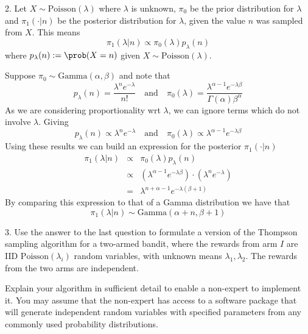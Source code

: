 \documentclass[11pt,a4paper]{article}
\begin{document}
\begin{answer}{2.}
  Let $X\sim\text{Poisson}(\lambda)$ where $\lambda$ is unknown, $\pi_0$ be the prior distribution for $\lambda$ and $\pi_1(\cdot|n)$ be the posterior distribution for $\lambda$, given the value $n$ was sampled from $X$. This means
  \[ \pi_1(\lambda|n)\propto\pi_0(\lambda)p_\lambda(n) \]
  where $p_\lambda(n):=\prob(X=n)$ given $X\sim\text{Poisson}(\lambda)$.
  \par Suppose $\pi_0\sim\text{Gamma}(\alpha,\beta)$ and note that
  \[ p_\lambda(n)=\frac{\lambda^ne^{-\lambda}}{n!}\quad\text{and}\quad \pi_0(\lambda)=\frac{\lambda^{\alpha-1}e^{-\lambda\beta}}{\Gamma(\alpha)\beta^\alpha} \]
  As we are considering proportionality wrt $\lambda$, we can ignore terms which do not involve $\lambda$. Giving
  \[ p_\lambda(n)\propto\lambda^ne^{-\lambda}\quad\text{and}\quad \pi_0(\lambda)\propto\lambda^{\alpha-1}e^{-\lambda\beta} \]
  Using these results we can build an expression for the posterior $\pi_1(\cdot|n)$
  \[\begin{array}{rcl}
      \pi_1(\lambda|n)&\propto&\pi_0(\lambda)p_\lambda(n)\\
      &\propto&\left(\lambda^{\alpha-1}e^{-\lambda\beta}\right)\cdot\left(\lambda^ne^{-\lambda}\right)\\
      &=&\lambda^{n+\alpha-1}e^{-\lambda(\beta+1)}
  \end{array}\]
  By comparing this expression to that of a Gamma distribution we have that
  \[ \pi_1(\lambda|n)\sim\text{Gamma}(\alpha+n,\beta+1) \]
\end{answer}

\begin{question}{3.}
  Use the answer to the last question to formulate a version of the Thompson sampling algorithm for a two-armed bandit, where the rewards from arm $I$ are IID $\text{Poisson}(\lambda_i)$ random variables, with unknown means $\lambda_1,\lambda_2$. The rewards from the two arms are independent.
  \par Explain your algorithm in sufficient detail to enable a non-expert to implement it. You may assume that the non-expert has access to a software package that will generate independent random variables with specified parameters from any commonly used probability distributions.
\end{question}
\end{document}
